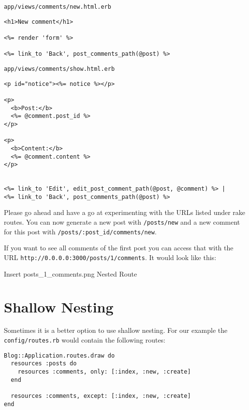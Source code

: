 \documentclass[a4paper]{book}
\begin{document}
\texttt{app/views/comments/new.html.erb}

\begin{shaded}\begin{verbatim}
<h1>New comment</h1>

<%= render 'form' %>

<%= link_to 'Back', post_comments_path(@post) %>
\end{verbatim}\end{shaded}

\texttt{app/views/comments/show.html.erb}

\begin{shaded}\begin{verbatim}
<p id="notice"><%= notice %></p>

<p>
  <b>Post:</b>
  <%= @comment.post_id %>
</p>

<p>
  <b>Content:</b>
  <%= @comment.content %>
</p>


<%= link_to 'Edit', edit_post_comment_path(@post, @comment) %> |
<%= link_to 'Back', post_comments_path(@post) %>
\end{verbatim}\end{shaded}

Please go ahead and have a go at experimenting with the URLs listed under rake routes. You can now generate a new post with \texttt{/posts/new} and a new comment for this post with \texttt{/posts/:post\_id/comments/new}.

If you want to see all comments of the first post you can access that with the URL \texttt{http://0.0.0.0:3000/posts/1/comments}. It would look like this:

Insert posts\_1\_comments.png Nested Route

\section{Shallow Nesting}\label{shallow-nesting}

Sometimes it is a better option to use shallow nesting. For our example the \texttt{config/routes.rb} would contain the following routes:

\begin{shaded}\begin{verbatim}
Blog::Application.routes.draw do
  resources :posts do
    resources :comments, only: [:index, :new, :create]
  end

  resources :comments, except: [:index, :new, :create]
end
\end{verbatim}\end{shaded}
\end{document}
